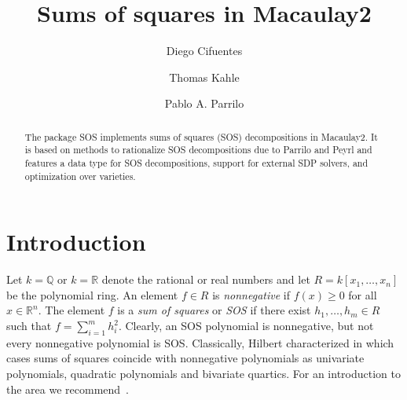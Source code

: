 \documentclass[11pt]{amsart}
\theoremstyle{plain}%
\theoremstyle{definition}
\theoremstyle{remark}
\newcommand{\SOS}{\textsc{SOS}\xspace}
\newcommand{\QQ}{\mathbb{Q}}
\newcommand{\RR}{\mathbb{R}}
\begin{document}
\title[SOS.m2]{Sums of squares in Macaulay2}

\author{Diego Cifuentes}
\address{Massachusetts Institute of Technology \\ Cambridge, MA, USA}

\author{Thomas Kahle}
\address{Otto-von-Guericke University \\ Magdeburg, Germany}

\author{Pablo A. Parrilo}
\address{Massachusetts Institute of Technology \\ Cambridge, MA, USA}


\begin{abstract}
  The package \SOS implements sums of squares (SOS) decompositions in
  Macaulay2.  It is based on methods to rationalize SOS decompositions
  due to Parrilo and Peyrl and features a data type for SOS
  decompositions, support for external SDP solvers, and optimization
  over varieties.
\end{abstract}

\maketitle


\section{Introduction}

Let $k = \QQ$ or $k = \RR$ denote the rational or real numbers and let $R = k[x_{1},\dots,x_{n}]$ be the polynomial ring.  
An element $f\in R$ is \emph{nonnegative} if $f(x) \ge 0$ for all $x \in \RR^{n}$.  
The element $f$ is a \emph{sum of squares} or \emph{SOS} if there exist $h_{1},\dots,h_{m} \in R$ such that $f=\sum_{i=1}^{m}h_{i}^{2}$.
Clearly, an SOS polynomial is nonnegative, but not every nonnegative polynomial is SOS.
Classically, Hilbert characterized in which cases sums of squares coincide with nonnegative polynomials as univariate polynomials, quadratic polynomials and bivariate quartics.  
For an introduction to the area we recommend~\cite{scheiderer2009positivity,blekherman2012semidefinite}.
\end{document}
